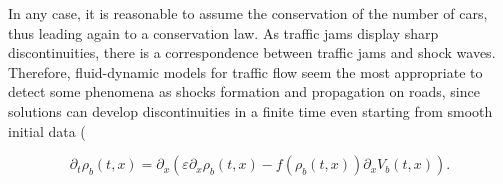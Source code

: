 In any case, it is reasonable to assume the conservation of the number of cars, thus leading again to a conservation law. As traffic jams display sharp discontinuities, there is a correspondence between traffic jams and shock waves. Therefore, fluid-dynamic models for traffic flow seem the most appropriate to detect some phenomena as shocks formation and propagation on roads, since solutions can develop discontinuities in a finite time even starting from smooth initial data (



\begin{equation} 
    \label{Drift-Diffusion-equation}
    \partial_t \rho_b (t,x) = \partial_x (\varepsilon \partial_x \rho_b (t,x) - f(\rho_b (t,x) ) \partial_x V_b (t,x)).
\end{equation}


